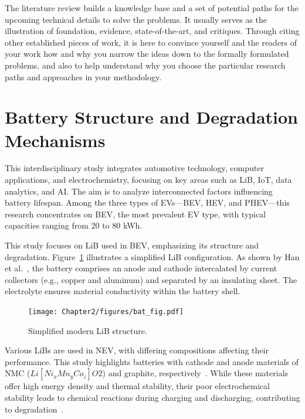 The literature review builds a knowledge base and a set of potential paths for the upcoming technical details to solve the problems.
It usually serves as the illustration of foundation, evidence, state-of-the-art, and critiques.
Through citing other established pieces of work, it is here to convince yourself and the readers of your work how and why you narrow the ideas down to the formally formulated problems,
and also to help understand why you choose the particular research paths and approaches in your methodology.

\newpage


\section{Battery Structure and Degradation Mechanisms}

This interdisciplinary study integrates automotive technology, computer applications, and electrochemistry, focusing on key areas such as \gls{LiB}, \gls{IoT}, data analytics, and \gls{AI}. 
The aim is to analyze interconnected factors influencing battery lifespan. 
Among the three types of EVs—\gls{BEV}, \gls{HEV}, and \gls{PHEV}—this research concentrates on \gls{BEV}, the most prevalent EV type, with typical capacities ranging from 20 to 80 kWh.

This study focuses on \gls{LiB} used in \gls{BEV}, emphasizing its structure and degradation. 
Figure~\ref{fig:battery_structure} illustrates a simplified \gls{LiB} configuration. 
As shown by Han et al.~\cite{han2019review}, the battery comprises an anode and cathode intercalated by current collectors (e.g., copper and aluminum) and separated by an insulating sheet. 
The electrolyte ensures material conductivity within the battery shell.

\begin{figure}[hbt]
    \centering
    \texttt{[image: Chapter2/figures/bat\_fig.pdf]}
    \caption{Simplified modern \gls{LiB} structure.}
    \label{fig:battery_structure}
\end{figure}

Various \glspl{LiB} are used in \gls{NEV}, with differing compositions affecting their performance. 
This study highlights batteries with cathode and anode materials of \gls{NMC} ($Li[Ni_xMn_yCo_z]O2$) and graphite, respectively~\cite{Lu2013}. 
While these materials offer high energy density and thermal stability, their poor electrochemical stability leads to chemical reactions during charging and discharging, contributing to degradation~\cite{xu2018progress, han2019review}.

